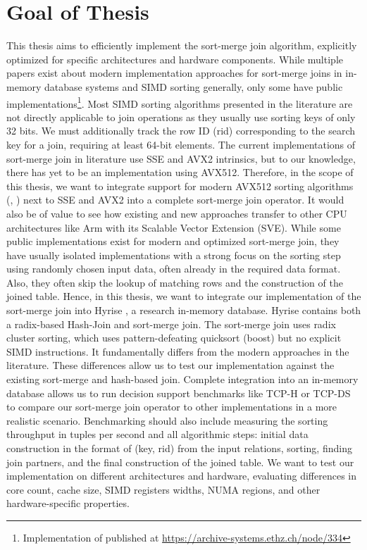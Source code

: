 \section{Goal of Thesis}
\label{sec:goal}


This thesis aims to efficiently implement the sort-merge join algorithm,
explicitly optimized for specific architectures and hardware components. While multiple papers
exist about modern implementation approaches for sort-merge joins in in-memory database systems
and SIMD sorting generally, only some have public 
implementations\footnote{Implementation of \cite{Balkesen} published at \url{https://archive-systems.ethz.ch/node/334}}.
Most SIMD sorting algorithms
presented in the literature are not directly applicable to join operations as they usually use
sorting keys of only 32 bits. We must additionally track the row ID (rid) corresponding to the search key for
a join, requiring at least 64-bit elements. The current implementations of sort-merge join in literature use SSE and AVX2 intrinsics,
but to our knowledge, there has yet to be an implementation using AVX512. Therefore, in the scope
of this thesis, we want to integrate support for modern AVX512 sorting algorithms (\cite{Watkins}, \cite{8855628})
next to SSE and AVX2 into a complete sort-merge join operator.
It would also be of value to see how existing and new approaches transfer to other
CPU architectures like Arm with its Scalable Vector Extension (SVE). While some public implementations
exist for modern and optimized sort-merge join, they have usually isolated implementations with a strong
focus on the sorting step using randomly chosen input data, often already in the required data format. 
Also, they often skip the lookup of matching rows and the construction of the joined table.
Hence, in this thesis, we want to integrate our implementation of the sort-merge join into Hyrise
\cite{DBLP:conf/edbt/DreselerK0KUP19},
a research in-memory database. Hyrise contains both a radix-based Hash-Join and sort-merge join.
The sort-merge join uses radix cluster sorting, which uses pattern-defeating quicksort (boost)
but no explicit SIMD instructions. It fundamentally differs from the modern approaches in the literature.
These differences allow us to test our implementation against the existing sort-merge and hash-based join.
Complete integration into an in-memory database allows us to run decision support benchmarks
like TCP-H or TCP-DS to compare our sort-merge join operator to other implementations in a more realistic scenario.
Benchmarking should also include measuring the sorting throughput in tuples per second and all 
algorithmic steps: initial data construction in the format of (key, rid) from the input relations,
sorting, finding join partners, and the final construction of the joined table. 
We want to test our implementation on different architectures and hardware, evaluating
differences in core count, cache size, SIMD registers widths, NUMA regions, 
and other hardware-specific properties.
